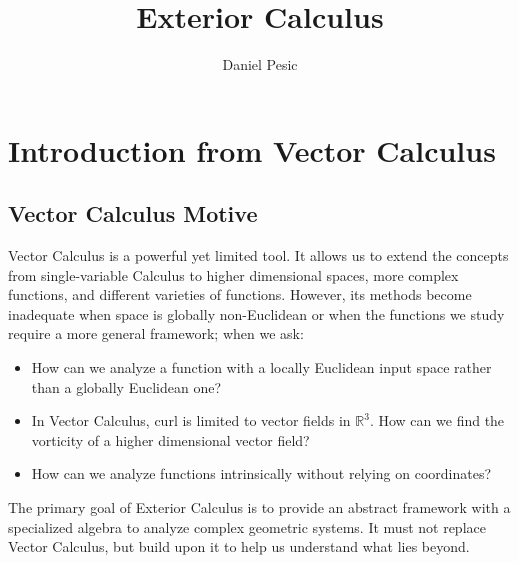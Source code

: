 \documentclass[12pt]{article}
\newcommand{\R}{\mathbb{R}}
\begin{document}
\title{Exterior Calculus}
\author{Daniel Pesic}
\maketitle
\newpage
\tableofcontents
\newpage
\section{Introduction from Vector Calculus}
\subsection{Vector Calculus Motive}
Vector Calculus is a powerful yet limited tool. It allows us to extend the concepts from single-variable Calculus to higher dimensional spaces, more complex functions, and different varieties of functions. However, its methods become inadequate when space is globally non-Euclidean or when the functions we study require a more general framework; when we ask: 
\begin{itemize}
    \item How can we analyze a function with a locally Euclidean input space rather than a globally Euclidean one? 
     \item In Vector Calculus, curl is limited to vector fields in $\R^3$. How can we find the vorticity of a higher dimensional vector field?
    \item How can we analyze functions intrinsically without relying on coordinates?
\end{itemize}

The primary goal of Exterior Calculus is to provide an abstract framework with a specialized algebra to analyze complex geometric systems. It must not replace Vector Calculus, but build upon it to help us understand what lies beyond.
\end{document}
